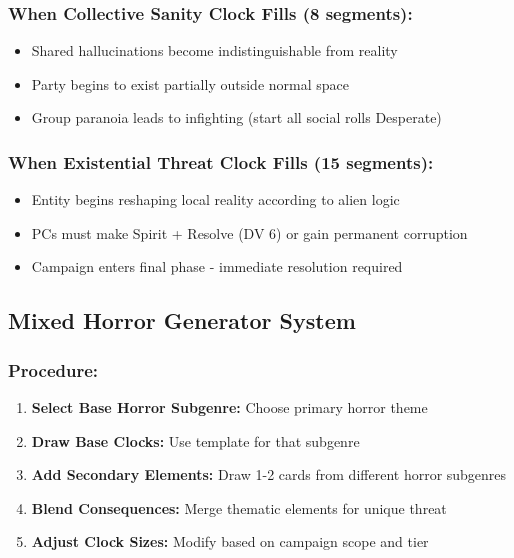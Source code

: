 \documentclass[11pt]{article}
\begin{document}
\subsubsection{When Collective Sanity Clock Fills (8 segments):}
\begin{itemize}
\item Shared hallucinations become indistinguishable from reality
\item Party begins to exist partially outside normal space
\item Group paranoia leads to infighting (start all social rolls Desperate)
\end{itemize}

\subsubsection{When Existential Threat Clock Fills (15 segments):}
\begin{itemize}
\item Entity begins reshaping local reality according to alien logic
\item PCs must make Spirit + Resolve (DV 6) or gain permanent corruption
\item Campaign enters final phase - immediate resolution required
\end{itemize}

\subsection{Mixed Horror Generator System}

\subsubsection{Procedure:}
\begin{enumerate}
\item \textbf{Select Base Horror Subgenre:} Choose primary horror theme
\item \textbf{Draw Base Clocks:} Use template for that subgenre
\item \textbf{Add Secondary Elements:} Draw 1-2 cards from different horror subgenres
\item \textbf{Blend Consequences:} Merge thematic elements for unique threat
\item \textbf{Adjust Clock Sizes:} Modify based on campaign scope and tier
\end{enumerate}
\end{document}
